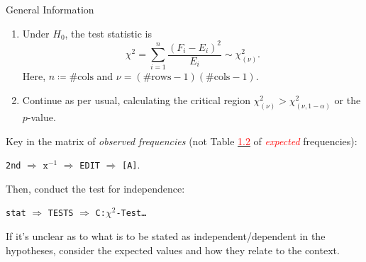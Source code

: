 \documentclass[../Notes.tex]{subfiles}
\begin{document}
\begin{stbox}{General Information}
\begin{enumerate}
\begin{table}[H]
\begin{tabular}{ScSc|Sc|Sc|Sc|Sc|Sc}
      \end{tabular}
      \caption{\emph{Expected} frequencies for a test of independence.}
      \label{table:tests-of-indepedence}
    \end{table}
    \item Under \(H_0\), the test statistic is
    \[\chi^2=\sum_{i=1}^{n}{\frac{(F_i-E_i)^2}{E_i}}\sim\chi_{(\nu)}^2.\]
    Here, \(n\coloneq\#\text{cols}\) and \(\nu=(\#\text{rows}-1)(\#\text{cols}-1)\).
    \item Continue as per usual, calculating the critical region \(\chi_{(\nu)}^2>\chi^2_{(\nu,1-\alpha)}\) or the \(p\)-value.
  \end{enumerate}
\end{stbox}
\begin{GCSkills}{}
  Key in the matrix of \emph{\textcolor{green!70!black}{observed} frequencies} (not Table \hyperlink{table:tests-of-indepedence}{\textcolor{red}{1.2}} of \emph{\textcolor{red}{expected}} frequencies): 
  \begin{center}
    \texttt{2nd} \(\Longrightarrow\) \(\texttt{x}^{-1}\) \(\Longrightarrow\) \texttt{EDIT} \(\Longrightarrow\) \texttt{[A]}.
  \end{center}
  Then, conduct the test for independence:
  \begin{center}
    \texttt{stat} \(\Longrightarrow\) \texttt{TESTS} \(\Longrightarrow\) \texttt{C:\(\chi^2\)-Test\dots}
  \end{center}
\end{GCSkills}
\begin{note}
  If it's unclear as to what is to be stated as independent/dependent in the hypotheses, consider the expected values and how they relate to the context.  
\end{note}
\end{document}
